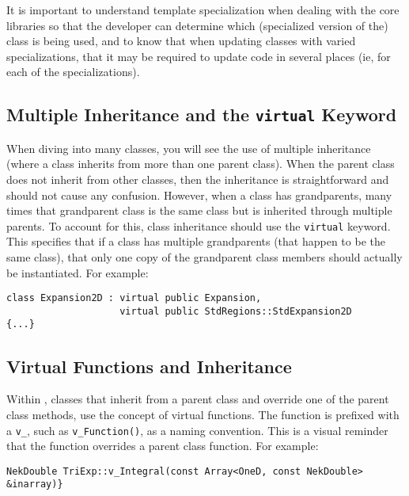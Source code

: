 It is important to understand template specialization when dealing
with the {\nek} core libraries so that the developer can
determine which (specialized version of the) class is being used,
and to know that when updating classes with varied specializations,
that it may be required to update code in several places (ie, for
each of the specializations).

\subsection{Multiple Inheritance and the \lstinline{virtual} Keyword}
When diving into many {\nek} classes, you will see the use of multiple
inheritance (where a class inherits from more than one parent
class).  When the parent class does not inherit from other classes,
then the inheritance is straightforward and should not cause any
confusion.  However, when a class has grandparents, many times that
grandparent class is the same class but is inherited through multiple
parents.  To account for this, class inheritance should use the
\lstinline{virtual} keyword.  This specifies that if a class has multiple
grandparents (that happen to be the same class), that only one copy of
the grandparent class members should actually be instantiated. For example:
\begin{lstlisting}
class Expansion2D : virtual public Expansion,
                    virtual public StdRegions::StdExpansion2D
{...}
\end{lstlisting}


\subsection{Virtual Functions and Inheritance}
Within {\nek}, classes
that inherit from a parent class and override one of the parent
class methods, use the concept of virtual functions. The function is prefixed with a \lstinline{v_}, such as \lstinline{v_Function()}, as a naming convention.  This is a visual reminder that the function overrides a parent class function. For example:
\begin{lstlisting}
NekDouble TriExp::v_Integral(const Array<OneD, const NekDouble> &inarray)}
\end{lstlisting}

